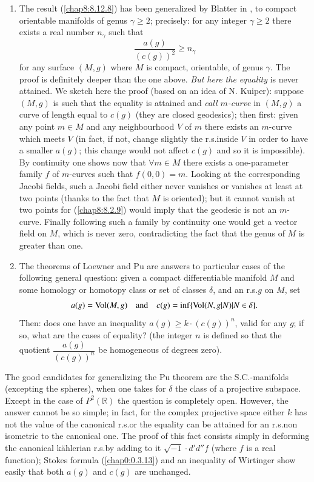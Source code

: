 \begin{remarks*}
\begin{enumerate}
\renewcommand{\theenumi}{\Alph{enumi}}
\renewcommand{\labelenumi}{\theenumi.}
\item The result (\ref{chap8:8.12.8}) has been generalized by Blatter in
  \cite{5}, to compact orientable manifolds of genus $\gamma\geq 2$;
  precisely: for any integer $\gamma\geq 2$ there exists a real number
  $n_{\gamma}$ such that
$$
\frac{a(g)}{(c(g))^{2}}\geq n_{\gamma}
$$
for any surface $(M,g)$ where $M$ is compact, orientable, of genus
$\gamma$. The proof is definitely deeper than the one above. {\em But
  here the equality} is never attained. We sketch here the proof
(based on an idea of N. Kuiper): suppose $(M,g)$ is such that the
equality is attained and {\em call $m$-curve} in $(M,g)$ a curve of
length equal to $c(g)$ (they are closed geodesics); then first: given
any point $m\in M$ and any neighbourhood $V$ of \pageoriginale $m$
there exists an $m$-curve which meets $V$ (in fact, if not, change
slightly the r.s.\@ inside $V$ in order to have a smaller $a(g)$; this
change would not affect $c(g)$ and so it is impossible). By continuity
one shows now that $\forall m\in M$ there exists a one-parameter
family $f$ of $m$-curves such that $f(0,0)=m$. Looking at the
corresponding Jacobi fields, such a Jacobi field either never vanishes
or vanishes at least at two points (thanks to the fact that $M$ is
oriented); but it cannot vanish at two points for (\ref{chap8:8.2.9})
would imply that the geodesic is not an $m$-curve. Finally following
such a family by continuity one would get a vector field on $M$, which
is never zero, contradicting the fact that the genus of $M$ is greater
than one.

\item The theorems of Loewner and Pu are answers to particular cases
  of the following general question: given a compact differentiable
  manifold $M$ and some homology or homotopy class or set of classes
  $\delta$, and an r.s.\@ $g$ on $M$, set
$$
a(g)=\operatorname{Vol}(M,g)\quad\text{and}\quad
c(g)=\inf\{\operatorname{Vol}(N,g|N)|N\in\delta\}.
$$
Then: does one have an inequality $a(g)\geq k\cdot (c(g))^{n}$, valid
for any $g$; if so, what are the cases of equality? (the integer $n$
is defined so that the quotient $\dfrac{a(g)}{(c(g))^{n}}$ be
homogeneous of degrees zero).
\end{enumerate}
\end{remarks*}

The good candidates for generalizing the Pu theorem are the
S.C.-manifolds (excepting the spheres), when one takes for $\delta$
the class of a projective subspace. Except in the case of
$P^{2}(\mathbb{R})$ the \pageoriginale question is completely
open. However, the answer cannot be so simple; in fact, for the
complex projective space either $k$ has not the value of the canonical
r.s.\@ or the equality can be attained for an r.s.\@ non isometric to
the canonical one. The proof of this fact consists simply in deforming
the canonical k\"ahlerian r.s.\@ by adding to it $\sqrt{-1}\cdot
d'd''f$ (where $f$ is a real function); Stokes formula (\ref{chap0:0.3.13})
and an inequality of Wirtinger show easily that both $a(g)$ and $c(g)$
are unchanged.



